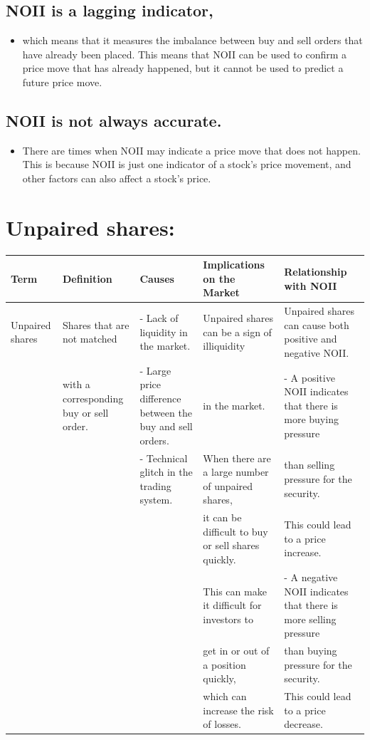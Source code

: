 \documentclass[11pt]{article}
\begin{document}
\subsection{NOII is a lagging indicator,}
\label{sec:org3bee541}
\begin{itemize}
\item which means that it measures the imbalance between buy and sell orders that have already been placed.
This means that NOII can be used to confirm a price move that has already happened,
but it cannot be used to predict a future price move.
\end{itemize}
\subsection{NOII is not always accurate.}
\label{sec:orgcdde621}
\begin{itemize}
\item There are times when NOII may indicate a price move that does not happen.
This is because NOII is just one indicator of a stock's price movement,
and other factors can also affect a stock's price.
\end{itemize}
\section{Unpaired shares:}
\label{sec:org1ce79d7}

\begin{center}
\begin{tabular}{lllll}
\textbf{\textbf{Term}} & \textbf{\textbf{Definition}} & \textbf{\textbf{Causes}} & \textbf{\textbf{Implications on the Market}} & \textbf{\textbf{Relationship with NOII}}\\[0pt]
\hline
Unpaired shares & Shares that are not matched & - Lack of liquidity in the market. & Unpaired shares can be a sign of illiquidity & Unpaired shares can cause both positive and negative NOII.\\[0pt]
 & with a corresponding buy or sell order. & - Large price difference between the buy and sell orders. & in the market. & - A positive NOII indicates that there is more buying pressure\\[0pt]
 &  & - Technical glitch in the trading system. & When there are a large number of unpaired shares, & than selling pressure for the security.\\[0pt]
 &  &  & it can be difficult to buy or sell shares quickly. & This could lead to a price increase.\\[0pt]
 &  &  & This can make it difficult for investors to & - A negative NOII indicates that there is more selling pressure\\[0pt]
 &  &  & get in or out of a position quickly, & than buying pressure for the security.\\[0pt]
 &  &  & which can increase the risk of losses. & This could lead to a price decrease.\\[0pt]
\hline
\end{tabular}
\end{center}
\end{document}
